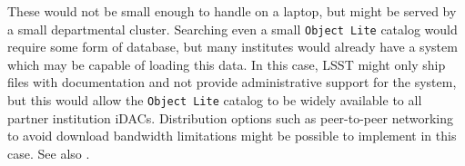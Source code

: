 These would not be small enough to handle on a laptop, but might be served by a small departmental cluster. 
Searching even a small {\tt Object Lite} catalog would require some form of database, but many institutes would already have a system which may be capable of loading this data. 
In this case, LSST might only ship files with documentation and not provide administrative support for the system, but this would allow the {\tt Object Lite} catalog to be widely available to all partner institution iDACs. Distribution options such as peer-to-peer networking to avoid download bandwidth limitations might be possible to implement in this case. See also .

